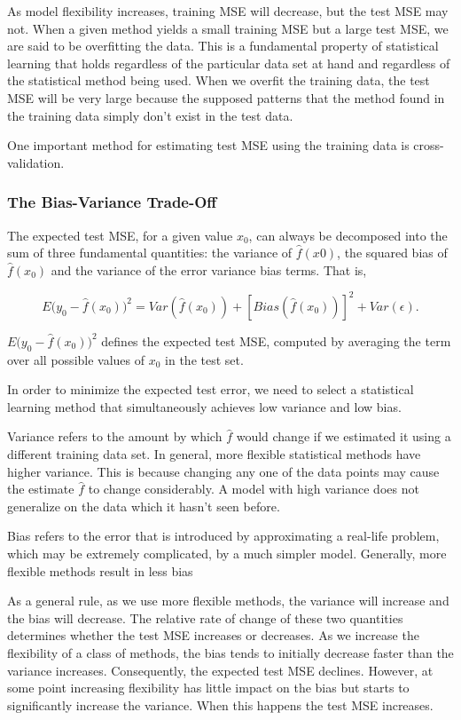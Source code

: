 \documentclass{article}
\begin{document}
As model flexibility increases, training MSE will decrease, but the test MSE may not. When a given method yields a small training MSE but a large test MSE, we are said to be overfitting the data. This is a fundamental property of statistical learning that holds regardless of the particular data set at hand and regardless of the statistical method being used. When we overfit
the training data, the test MSE will be very large because the supposed patterns that the method found in the training data simply don’t exist in the test data. 

One important method for estimating test MSE using the training data is cross-validation. 

\subsubsection{The Bias-Variance Trade-Off}

The expected test MSE, for a given value $x_0$, can always be decomposed into the sum of three fundamental quantities: the variance of $\hat f(x0)$, the squared bias of $\hat f(x_0)$ and the variance of the error variance bias terms. That is,

\[
    E \big (y_0 - \hat f(x_0) \big )^2 = Var( \hat f(x_0)) + [Bias( \hat f(x_0))]^2 + Var(\epsilon).
\]

$E \big (y_0 - \hat f(x_0) \big )^2$ defines the expected test MSE, computed by averaging the term over all possible values of $x_0$ in the test set.

In order to minimize the expected test error, we need to select a statistical learning method that simultaneously achieves low variance and low bias. 

Variance refers to the amount by which $\hat f$ would change if we estimated it using a different training data set. In general, more flexible statistical methods have higher variance. This is because changing any one of the data points may cause the estimate $\hat f$ to change considerably. A model with high variance does not generalize on the data which it hasn't seen before.

Bias refers to the error that is introduced by approximating a real-life problem, which may be extremely complicated, by a much simpler model. Generally, more flexible methods result in less bias

As a general rule, as we use more flexible methods, the variance will increase and the bias will decrease. The relative rate of change of these two quantities determines whether the test MSE increases or decreases. As we increase the flexibility of a class of methods, the bias tends to initially decrease faster than the variance increases. Consequently, the expected test MSE declines. However, at some point increasing flexibility has little impact on the bias but starts to significantly increase the variance. When this happens the test MSE increases. 
\end{document}
